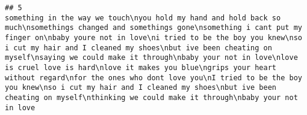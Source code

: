 \documentclass[]{article}
\begin{document}
\begin{verbatim}
## 5                                                                                                                                                                                                                                                                                                                                                                                                                                                                                                                                                                                                                                                                                                                                                                                                                                                                                                                                                                                                                                                                                                                                                                                                                                                                                                                                                                                                                                                                                                                                                                                                                                                                                                                                                                                                                                                                                                                                                                                                                                                                                                                                                                                                                                                                                                                                                                                                                                                                                                        something in the way we touch\nyou hold my hand and hold back so much\nsomethings changed and somethings gone\nsomething i cant put my finger on\nbaby youre not in love\ni tried to be the boy you knew\nso i cut my hair and I cleaned my shoes\nbut ive been cheating on myself\nsaying we could make it through\nbaby your not in love\nlove is cruel love is hard\nlove it makes you blue\ngrips your heart without regard\nfor the ones who dont love you\nI tried to be the boy you knew\nso i cut my hair and I cleaned my shoes\nbut ive been cheating on myself\nthinking we could make it through\nbaby your not in love

\end{verbatim}
\end{document}
